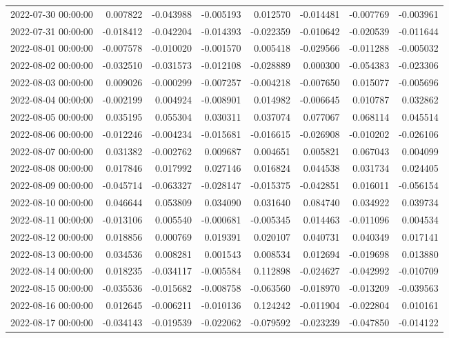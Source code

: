 \begin{tabular}{lrrrrrrr}
2022-07-30 00:00:00 & 0.007822 & -0.043988 & -0.005193 & 0.012570 & -0.014481 & -0.007769 & -0.003961 \\
2022-07-31 00:00:00 & -0.018412 & -0.042204 & -0.014393 & -0.022359 & -0.010642 & -0.020539 & -0.011644 \\
2022-08-01 00:00:00 & -0.007578 & -0.010020 & -0.001570 & 0.005418 & -0.029566 & -0.011288 & -0.005032 \\
2022-08-02 00:00:00 & -0.032510 & -0.031573 & -0.012108 & -0.028889 & 0.000300 & -0.054383 & -0.023306 \\
2022-08-03 00:00:00 & 0.009026 & -0.000299 & -0.007257 & -0.004218 & -0.007650 & 0.015077 & -0.005696 \\
2022-08-04 00:00:00 & -0.002199 & 0.004924 & -0.008901 & 0.014982 & -0.006645 & 0.010787 & 0.032862 \\
2022-08-05 00:00:00 & 0.035195 & 0.055304 & 0.030311 & 0.037074 & 0.077067 & 0.068114 & 0.045514 \\
2022-08-06 00:00:00 & -0.012246 & -0.004234 & -0.015681 & -0.016615 & -0.026908 & -0.010202 & -0.026106 \\
2022-08-07 00:00:00 & 0.031382 & -0.002762 & 0.009687 & 0.004651 & 0.005821 & 0.067043 & 0.004099 \\
2022-08-08 00:00:00 & 0.017846 & 0.017992 & 0.027146 & 0.016824 & 0.044538 & 0.031734 & 0.024405 \\
2022-08-09 00:00:00 & -0.045714 & -0.063327 & -0.028147 & -0.015375 & -0.042851 & 0.016011 & -0.056154 \\
2022-08-10 00:00:00 & 0.046644 & 0.053809 & 0.034090 & 0.031640 & 0.084740 & 0.034922 & 0.039734 \\
2022-08-11 00:00:00 & -0.013106 & 0.005540 & -0.000681 & -0.005345 & 0.014463 & -0.011096 & 0.004534 \\
2022-08-12 00:00:00 & 0.018856 & 0.000769 & 0.019391 & 0.020107 & 0.040731 & 0.040349 & 0.017141 \\
2022-08-13 00:00:00 & 0.034536 & 0.008281 & 0.001543 & 0.008534 & 0.012694 & -0.019698 & 0.013880 \\
2022-08-14 00:00:00 & 0.018235 & -0.034117 & -0.005584 & 0.112898 & -0.024627 & -0.042992 & -0.010709 \\
2022-08-15 00:00:00 & -0.035536 & -0.015682 & -0.008758 & -0.063560 & -0.018970 & -0.013209 & -0.039563 \\
2022-08-16 00:00:00 & 0.012645 & -0.006211 & -0.010136 & 0.124242 & -0.011904 & -0.022804 & 0.010161 \\
2022-08-17 00:00:00 & -0.034143 & -0.019539 & -0.022062 & -0.079592 & -0.023239 & -0.047850 & -0.014122 \\

\end{tabular}
